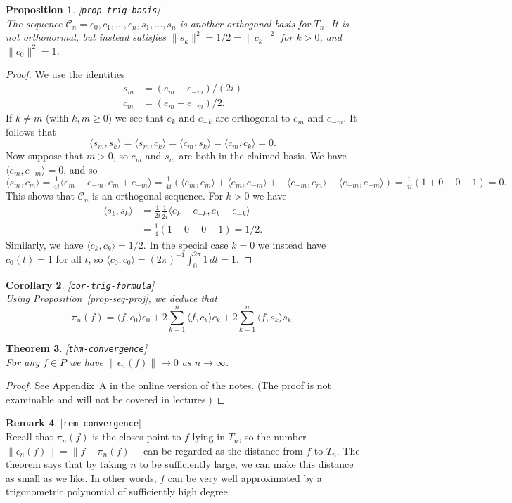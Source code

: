 \documentclass{amsart}
\newcommand{\lbl}[1]{\label{#1}\textup{[\texttt{#1}]}\ \\}
\newcommand{\lbl}{\label}
\newcommand{\ep}        {\epsilon}
\newcommand{\ip}[1]     {\langle #1\rangle}
\newcommand{\ov}[1]     {\overline{#1}}
\newcommand{\CC}        {{\mathcal{C}}}
\renewcommand{\:}       {\colon}
\newtheorem{theorem}{Theorem}[section]
\newtheorem{proposition}[theorem]{Proposition}
\newtheorem{corollary}[theorem]{Corollary}
\theoremstyle{definition}
\newtheorem{remark}[theorem]{Remark}
\begin{document}
\begin{proposition}\lbl{prop-trig-basis}
 The sequence $\CC_n=c_0,c_1,\dotsc,c_n,s_1,\dotsc,s_n$ is
 another orthogonal basis for $T_n$.  It is not orthonormal,
 but instead satisfies $\|s_k\|^2=1/2=\|c_k\|^2$ for $k>0$,
 and $\|c_0\|^2=1$.
\end{proposition}
\begin{proof}
 We use the identities
 \begin{align*}
  s_m &= (e_m-e_{-m})/(2i) \\
  c_m &= (e_m+e_{-m})/2.
 \end{align*}
 If $k\neq m$ (with $k,m\geq 0$) we see that $e_k$ and
 $e_{-k}$ are orthogonal to $e_m$ and $e_{-m}$.  It follows
 that
 \[ \ip{s_m,s_k} = \ip{s_m,c_k} =
    \ip{c_m,s_k} = \ip{c_m,c_k} = 0.
 \]
 Now suppose that $m>0$, so $c_m$ and $s_m$ are both in the
 claimed basis.  We have $\ip{e_m,e_{-m}}=0$, and so
 \[
  \ip{s_m,c_m} =
  \tfrac{1}{4i} \ip{e_m-e_{-m},e_m+e_{-m}} = 
  \tfrac{1}{4i} (\ip{e_m,e_m} + \ip{e_m,e_{-m}} +
                 -\ip{e_{-m},e_m} - \ip{e_{-m},e_{-m}}) =
  \tfrac{1}{4i} (1+0-0-1) = 0.
 \]
 This shows that $\CC_n$ is an orthogonal sequence.  For
 $k>0$ we have 
 \begin{align*}
  \ip{s_k,s_k} &= \tfrac{1}{2i} \tfrac{1}{\ov{2i}}
                  \ip{e_k-e_{-k},e_k-e_{-k}} \\
   &= \tfrac{1}{4} (1-0-0+1) = 1/2.
 \end{align*}
 Similarly, we have $\ip{c_k,c_k}=1/2$.  In the special case
 $k=0$ we instead have $c_0(t)=1$ for all $t$, so
 $\ip{c_0,c_0}=(2\pi)^{-1}\int_0^{2\pi} 1\,dt=1$.
\end{proof}
\begin{corollary}\lbl{cor-trig-formula}
 Using Proposition~\ref{prop-seq-proj}, we deduce that
 \[ \pi_n(f) = \ip{f,c_0}c_0 + 2\sum_{k=1}^n\ip{f,c_k}c_k
                             + 2\sum_{k=1}^n\ip{f,s_k}s_k.
 \]
\end{corollary}

\begin{theorem}\lbl{thm-convergence}
 For any $f\in P$ we have $\|\ep_n(f)\|\to 0$ as $n\to\infty$.
\end{theorem}
\begin{proof}
 See Appendix~A in the online version of the notes.
 (The proof is not examinable and will not be covered in lectures.)
\end{proof}
\begin{remark}\lbl{rem-convergence}
 Recall that $\pi_n(f)$ is the closes point to $f$ lying in
 $T_n$, so the number $\|\ep_n(f)\|=\|f-\pi_n(f)\|$ can be
 regarded as the distance from $f$ to $T_n$.  The theorem
 says that by taking $n$ to be sufficiently large, we can
 make this distance as small as we like.  In other words,
 $f$ can be very well approximated by a trigonometric
 polynomial of sufficiently high degree.
\end{remark}
\end{document}

